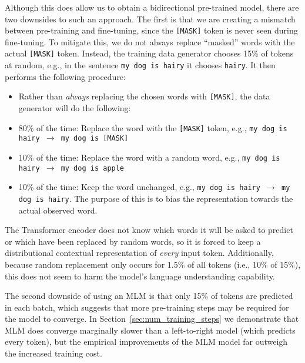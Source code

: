 Although this does allow us to obtain a bidirectional pre-trained model, there are two downsides to such an approach. The first is that we are creating a mismatch between pre-training and fine-tuning, since the {\tt [MASK]} token is never seen during fine-tuning. To mitigate this, we do not always replace ``masked'' words with the actual {\tt [MASK]} token. Instead, the training data generator chooses 15\% of tokens at random, e.g., in the sentence {\tt {\small my dog is hairy}} it chooses {\tt {\small hairy}}. It then performs the following procedure:
\begin{itemize}
\item Rather than {\em always} replacing the chosen words with {\tt [MASK]}, the data generator will do the following:
\item 80\% of the time: Replace the word with the {\tt [MASK]} token, e.g., {\tt {\small my dog is hairy $\rightarrow$ my dog is [MASK]}}
\item 10\% of the time: Replace the word with a random word, e.g., {\tt {\small my dog is hairy $\rightarrow$ my dog is apple}}
\item 10\% of the time: Keep the word unchanged, e.g., {\tt {\small my dog is hairy $\rightarrow$ my dog is hairy}}. The purpose of this is to bias the representation towards the actual observed word.
\end{itemize}

The Transformer encoder does not know which words it will be asked to predict or which have been replaced by random words, so it is forced to keep a distributional contextual representation of {\it every} input token. Additionally, because random replacement only occurs for 1.5\% of all tokens (i.e., 10\% of 15\%), this does not seem to harm the model's language understanding capability. 

The second downside of using an MLM is that only 15\% of tokens are predicted in each batch, which suggests that more pre-training steps may be required for the model to converge. In Section~\ref{sec:num_training_steps} we demonstrate that MLM does converge marginally slower than a left-to-right model (which predicts every token), but the empirical improvements of the MLM model far outweigh the increased training cost.

